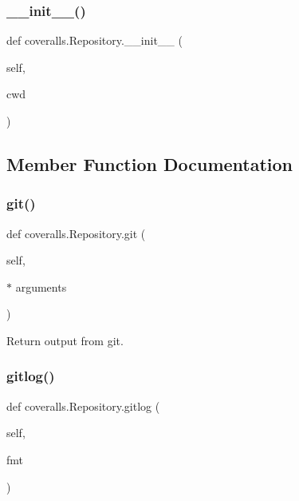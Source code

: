 \subsubsection{\texorpdfstring{\_\_init\_\_()}{\_\_init\_\_()}}
{\footnotesize\ttfamily def coveralls.\+Repository.\+\_\+\+\_\+init\+\_\+\+\_\+ (\begin{DoxyParamCaption}\item[{}]{self,  }\item[{}]{cwd }\end{DoxyParamCaption})}



\subsection{Member Function Documentation}
\mbox{\label{classcoveralls_1_1Repository_a64be8a51048982d129efd26b4b2a14ee}} 
\subsubsection{\texorpdfstring{git()}{git()}}
{\footnotesize\ttfamily def coveralls.\+Repository.\+git (\begin{DoxyParamCaption}\item[{}]{self,  }\item[{$\ast$}]{arguments }\end{DoxyParamCaption})}

\begin{DoxyVerb}Return output from git.\end{DoxyVerb}
 \mbox{\label{classcoveralls_1_1Repository_a91d73f9476ff6c02d0baf68bbeed8779}} 
\subsubsection{\texorpdfstring{gitlog()}{gitlog()}}
{\footnotesize\ttfamily def coveralls.\+Repository.\+gitlog (\begin{DoxyParamCaption}\item[{}]{self,  }\item[{}]{fmt }\end{DoxyParamCaption})}




